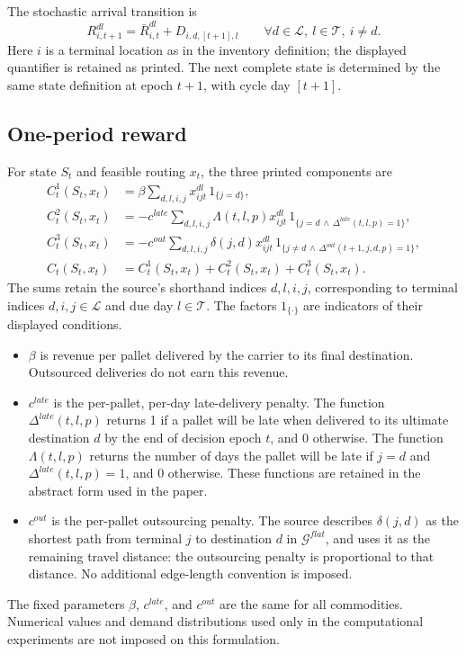 \documentclass{article}
\begin{document}
The stochastic arrival transition is
\begin{equation}
R_{i,t+1}^{dl}=\bar R_{i,t}^{dl}+D_{i,d,[t+1],l}
\qquad\forall d\in\mathcal{L},\ l\in\mathcal{T},\ i\ne d.
\tag{3}
\end{equation}
Here $i$ is a terminal location as in the inventory definition; the displayed quantifier is retained as printed. The next complete state is determined by the same state definition at epoch $t+1$, with cycle day $[t+1]$.

\subsection*{One-period reward}
For state $S_t$ and feasible routing $x_t$, the three printed components are
\begin{align*}
C_t^1(S_t,x_t)
&=\beta\sum_{d,l,i,j}x_{ijt}^{dl}\,1_{\{j=d\}},\\
C_t^2(S_t,x_t)
&=-c^{late}\sum_{d,l,i,j}\Lambda(t,l,p)x_{ijt}^{dl}
\,1_{\{j=d\,\wedge\,\Delta^{late}(t,l,p)=1\}},\\
C_t^3(S_t,x_t)
&=-c^{out}\sum_{d,l,i,j}\delta(j,d)x_{ijt}^{dl}
\,1_{\{j\ne d\,\wedge\,\Delta^{out}(t+1,j,d,p)=1\}},\\
C_t(S_t,x_t)
&=C_t^1(S_t,x_t)+C_t^2(S_t,x_t)+C_t^3(S_t,x_t).
\end{align*}
The sums retain the source's shorthand indices $d,l,i,j$, corresponding to terminal indices $d,i,j\in\mathcal{L}$ and due day $l\in\mathcal{T}$. The factors $1_{\{\cdot\}}$ are indicators of their displayed conditions.

\begin{itemize}
\item $\beta$ is revenue per pallet delivered by the carrier to its final destination. Outsourced deliveries do not earn this revenue.
\item $c^{late}$ is the per-pallet, per-day late-delivery penalty. The function $\Delta^{late}(t,l,p)$ returns 1 if a pallet will be late when delivered to its ultimate destination $d$ by the end of decision epoch $t$, and 0 otherwise. The function $\Lambda(t,l,p)$ returns the number of days the pallet will be late if $j=d$ and $\Delta^{late}(t,l,p)=1$, and 0 otherwise. These functions are retained in the abstract form used in the paper.
\item $c^{out}$ is the per-pallet outsourcing penalty. The source describes $\delta(j,d)$ as the shortest path from terminal $j$ to destination $d$ in $\mathcal{G}^{flat}$, and uses it as the remaining travel distance: the outsourcing penalty is proportional to that distance. No additional edge-length convention is imposed.
\end{itemize}
The fixed parameters $\beta$, $c^{late}$, and $c^{out}$ are the same for all commodities. Numerical values and demand distributions used only in the computational experiments are not imposed on this formulation.
\end{document}
